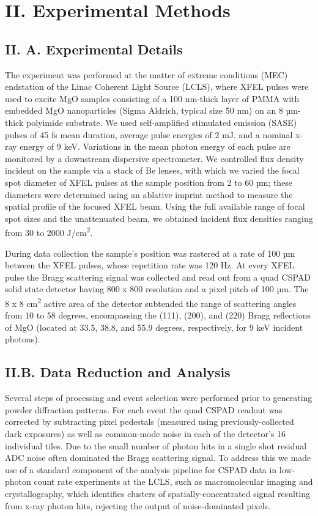 \section{II. Experimental Methods}

\subsection{II. A. Experimental Details}

The experiment was performed at the matter of extreme conditions (MEC)
endstation of the Linac Coherent Light Source (LCLS), where XFEL pulses
were used to excite MgO samples consisting of a 100 nm-thick layer of
PMMA with embedded MgO nanoparticles (Sigma Aldrich, typical size 50 nm)
on an 8 µm-thick polyimide substrate. We used self-amplified stimulated
emission (SASE) pulses of 45 fs mean duration, average pulse energies of
2 mJ, and a nominal x-ray energy of 9 keV. Variations in the mean photon
energy of each pulse are monitored by a downstream dispersive
spectrometer. We controlled flux density incident on the sample via a
stack of Be lenses, with which we varied the focal spot diameter of XFEL
pulses at the sample position from 2 to 60 µm; these diameters were
determined using an ablative imprint method to measure the spatial
profile of the focused XFEL beam.  Using the full available range
of focal spot sizes and the unattenuated beam, we obtained incident flux
densities ranging from 30 to 2000 J/cm\textsuperscript{2}.

During data collection the sample's position was rastered at a rate of
100 µm between the XFEL pulses, whose repetition rate was 120 Hz. At
every XFEL pulse the Bragg scattering signal was collected and read out
from a quad CSPAD solid state detector having 800 x 800 resolution and a
pixel pitch of 100 µm. \cite{HART2012CSPAD} The 8 x 8 cm\textsuperscript{2}
active area of the detector subtended the range of scattering angles
from 10 to 58 degrees, encompassing the (111), (200), and (220) Bragg
reflections of MgO (located at 33.5, 38.8, and 55.9 degrees,
respectively, for 9 keV incident photons).

\subsection{II.B. Data Reduction and Analysis}

Several steps of processing and event selection were performed prior to
generating powder diffraction patterns. For each event the quad CSPAD
readout was corrected by subtracting pixel pedestals (measured using
previously-collected dark exposures) as well as common-mode noise in
each of the detector's 16 individual tiles. \cite{HART2012CSPAD} Due to the small
number of photon hits in a single shot residual ADC noise often
dominated the Bragg scattering signal. To address this we made use of a
standard component of the analysis pipeline for CSPAD data in low-photon
count rate experiments at the LCLS, such as macromolecular imaging and
crystallography, which identifies clusters of spatially-concentrated
signal resulting from x-ray photon hits, rejecting the output of
noise-dominated pixels. \cite{DAMIANI2016LINAC}

